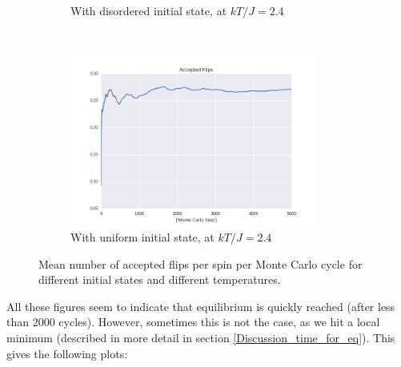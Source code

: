 \documentclass[a4paper, 10pt]{article}
\begin{document}
\begin{figure}[!ht]
\begin{subfigure}[H!]{0.5\textwidth}
        \caption{With disordered initial state, at $kT/J=2.4$}
    \end{subfigure}%
    ~ 
    \begin{subfigure}[H!]{0.5\textwidth}
        \centering
        \includegraphics[height=2.2in]{flipsWUpStartT24.png}
        \caption{With uniform initial state, at $kT/J=2.4$}
    \end{subfigure}
      \caption{Mean number of accepted flips per spin per Monte Carlo cycle for different initial states and different temperatures.}\label{fig:20x20_Sweep_flips}
\end{figure}
All these figures seem to indicate that equilibrium is quickly reached (after less than 2000 cycles). However, sometimes this is not the case, as we hit a local minimum (described in more detail in section \ref{Discussion_time_for_eq}). This gives the following plots:
\clearpage
\end{document}
